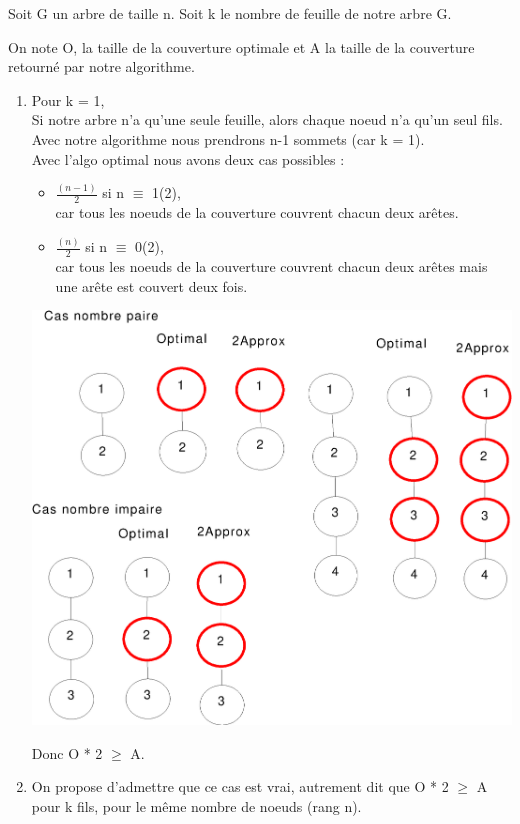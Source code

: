 Soit G un arbre de taille n. Soit k le nombre de feuille de notre
arbre G.

On note O, la taille de la couverture optimale et A la taille de la couverture retourn\'e par notre algorithme.

\bigskip
\begin{enumerate}
 \item Pour k = 1,\\


Si notre arbre n'a qu'une seule feuille, alors chaque noeud n'a qu'un
seul fils. Avec notre algorithme nous prendrons n-1 sommets (car k
= 1).\\
Avec l'algo optimal nous avons deux cas possibles :
\begin{itemize}
      	\item $\frac{(n - 1)}{2}$ si n $\equiv$ 1(2),\\
		 car tous les noeuds de la couverture couvrent chacun deux ar\^etes.\\
	\item $\frac{(n)}{2}$ si n $\equiv$ 0(2),\\
		car tous les noeuds de la couverture couvrent chacun deux ar\^etes mais une ar\^ete est couvert deux fois.
\end{itemize}

\bigskip
\includegraphics[width=15cm]{demo1}

Donc O  * 2 $\geq$ A.

\item On propose d'admettre que ce cas est vrai, autrement dit que O  * 2 $\geq$ A pour k fils, pour le m\^eme nombre de noeuds (rang n). 


\end{enumerate}
